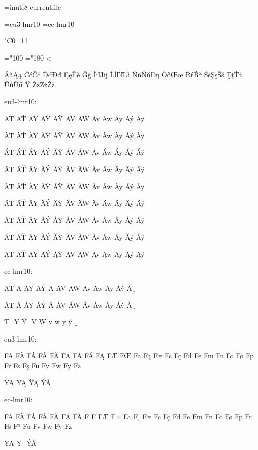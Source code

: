 
%
\parindent=0pt
\ocp\ORGin=inutf8
\InputTranslation currentfile \ORGin

\font\eulmr=eu3-lmr10
\font\eclmr=ec-lmr10
\eulmr

\catcode"C0=11

\newcount\ChrA\newcount\ChrB
\def\SetCatCode#1{%
 \loop\ifnum\ChrA<\ChrB
  \catcode\ChrA=#1
  \sfcode{}
  \advance{}\relax \repeat
}

\ChrA="100 \ChrB="180
\SetCatCode{11}

ĂăĄą ĆćČč ĎďĐđ ĘęĚě Ğğ İıĲĳ ĹĺĽľŁł ŃńŇňŊŋ
ŐőŒœ ŔŕŘř ŚśŞşŠš ŢţŤť ŮůŰű Ÿ ŹźŻżŽž

eu3-lmr10:

AT AŤ AY AÝ AŸ AV AW Av Aw Ay Aý Aÿ

ÀT ÀŤ ÀY ÀÝ ÀŸ ÀV ÀW Àv Àw Ày Àý Àÿ

ÁT ÁŤ ÁY ÁÝ ÁŸ ÁV ÁW Áv Áw Áy Áý Áÿ

ÂT ÂŤ ÂY ÂÝ ÂŸ ÂV ÂW Âv Âw Ây Âý Âÿ

ÃT ÃŤ ÃY ÃÝ ÃŸ ÃV ÃW Ãv Ãw Ãy Ãý Ãÿ

ÄT ÄŤ ÄY ÄÝ ÄŸ ÄV ÄW Äv Äw Äy Äý Äÿ

ÅT ÅŤ ÅY ÅÝ ÅŸ ÅV ÅW Åv Åw Åy Åý Åÿ

ĂT ĂŤ ĂY ĂÝ ĂŸ ĂV ĂW Ăv Ăw Ăy Ăý Ăÿ

ĄT ĄŤ ĄY ĄÝ ĄŸ ĄV ĄW Ąv Ąw Ąy Ąý Ąÿ

{
\eclmr

ec-lmr10:

AT A^^94 AY A^^dd A^^98 AV AW Av Aw Ay A^^fd A^^b8

^^c5T ^^c5^^94 ^^c5Y ^^c5^^dd ^^c5^^98 ^^c5V ^^c5W ^^c5v ^^c5w ^^c5y ^^c5^^fd ^^c5^^b8

^^81T ^^81^^94 ^^81Y ^^81^^dd ^^81^^98 ^^81V ^^81W ^^81v ^^81w ^^81y ^^81^^fd ^^81^^b8
}

eu3-lmr10:

FA FÀ FÁ FÂ FÃ FÄ FÅ FĂ FĄ FÆ FŒ Fa Fą Fæ Fc Fç Fd Fe Fm Fn Fo Fø Fp Fr Fs Fş Fu Fv Fw Fy Fz

\hbox{YA}
\hbox{YĄ}
\hbox{ŸĄ}
\hbox{ÝÅ}

{
\eclmr

ec-lmr10:

FA F^^c0 F^^c1 F^^c2 F^^c3 F^^c4 F^^c5 F^^80 F^^81 F^^c6 F^^d7 Fa F^^a1 F^^e6 Fc F^^e7 Fd Fe Fm Fn Fo F^^f8 Fp Fr Fs F^^b3 Fu Fv Fw Fy Fz

\hbox{YA}
\hbox{Y^^81}
\hbox{^^98^^81}
\hbox{^^dd^^c5}
}

